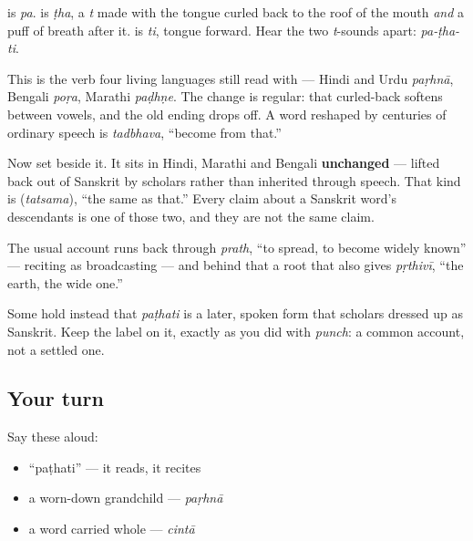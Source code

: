 \begin{sounds}
\textbf{} is \emph{pa}. \textbf{} is \emph{ṭha}, a \emph{t} made with the tongue curled back to the roof of the mouth \emph{and} a puff of breath after it. \textbf{} is \emph{ti}, tongue forward. Hear the two \emph{t}-sounds apart: \emph{pa-ṭha-ti}.
\end{sounds}

\begin{cousinweb}
This is the verb four living languages still read with — Hindi and Urdu \emph{paṛhnā}, Bengali \emph{poṛa}, Marathi \emph{paḍhṇe}. The change is regular: that curled-back \textbf{} softens between vowels, and the old ending drops off. A word reshaped by centuries of ordinary speech is \emph{tadbhava}, \textquotedblleft{}become from that.\textquotedblright{}

Now set \textbf{} beside it. It sits in Hindi, Marathi and Bengali \textbf{unchanged} — lifted back out of Sanskrit by scholars rather than inherited through speech. That kind is \textbf{} (\emph{tatsama}), \textquotedblleft{}the same as that.\textquotedblright{} Every claim about a Sanskrit word's descendants is one of those two, and they are not the same claim.
\end{cousinweb}

\begin{grammarlens}[title={Grammar Lens: where \sk{पठति} itself came from}]
The usual account runs back through \emph{prath}, \textquotedblleft{}to spread, to become widely known\textquotedblright{} — reciting as broadcasting — and behind that a root that also gives \emph{pṛthivī}, \textquotedblleft{}the earth, the wide one.\textquotedblright{}

Some hold instead that \emph{paṭhati} is a later, spoken form that scholars dressed up as Sanskrit. Keep the label on it, exactly as you did with \emph{punch}: a common account, not a settled one.
\end{grammarlens}

\subsection*{Your turn}
Say these aloud:

\begin{itemize}
\raggedright
  \item \textquotedblleft{}paṭhati\textquotedblright{} — it reads, it recites
  \item a worn-down grandchild — \emph{paṛhnā}
  \item a word carried whole — \emph{cintā}
\end{itemize}

